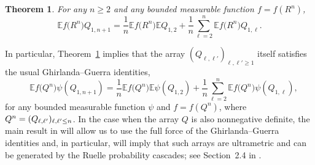 \documentclass[aop,MSNbibl,dvips]{arximspdf}
\def\cal{\mathscr}
\newcommand{\spe}{{\cal S}}
\newcommand{\WW}{{\cal W}}
\newcommand{\smsp}{}
\newcommand{\e}{\mathbb{E}}
\newtheorem{theorem}{Theorem}
\begin{document}
\begin{theorem}\label{ThGGms}
For any $n\geq2$ and any bounded measurable function $f=f(R^n)$,
%
\begin{equation}
\e f\bigl(R^n\bigr) Q_{1,n+1} = \frac{1}{n}\e f
\bigl(R^n\bigr) \smsp\e Q_{1,2} + \frac{1}{n}\sum
_{\ell=2}^{n}\e f\bigl(R^n\bigr)
Q_{1,\ell}. \label{GGms}
\end{equation}
%
\end{theorem}





\begin{remark*} In particular, Theorem~\ref{ThGGms} implies that the
array $(Q_{\ell,\ell'})_{\ell,\ell'\geq1}$ itself satisfies the usual
Ghirlanda--Guerra identities,
%
\begin{equation}\quad
\e f\bigl(Q^n\bigr) \psi(Q_{1,n+1}) = \frac{1}{n}\e f
\bigl(Q^n\bigr) \smsp\e\psi(Q_{1,2}) + \frac{1}{n}\sum
_{\ell=2}^{n}\e f\bigl(Q^n\bigr)
\psi(Q_{1,\ell}), \label{GGreg}
\end{equation}
%
for any bounded measurable function $\psi$ and $f=f(Q^n)$, where $Q^n
=\break  (Q_{\ell,\ell'})_{\ell,\ell'\leq n}$. In the case when the array $Q$
is also nonnegative definite, the main result in \cite{PUltra} will
allow us to use the full force of the Ghirlanda--Guerra identities and,
in particular, will imply that such arrays are ultrametric and can be
generated by the Ruelle probability cascades;
see Section~2.4 in \cite{SKmodel}.
\end{remark*}
\end{document}
